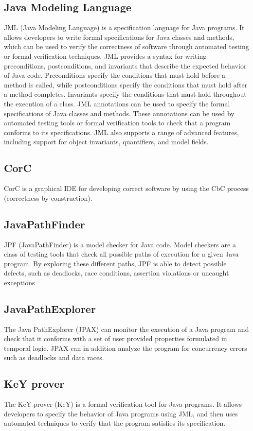 \subsection{Java Modeling Language}
JML (Java Modeling Language) is a specification language for Java programs. It allows developers to write formal specifications for Java classes and methods, which can be used to verify the correctness of software through automated testing or formal verification techniques.
JML provides a syntax for writing preconditions, postconditions, and invariants that describe the expected behavior of Java code. Preconditions specify the conditions that must hold before a method is called, while postconditions specify the conditions that must hold after a method completes. Invariants specify the conditions that must hold throughout the execution of a class.
JML annotations can be used to specify the formal specifications of Java classes and methods. These annotations can be used by automated testing tools or formal verification tools to check that a program conforms to its specifications. JML also supports a range of advanced features, including support for object invariants, quantifiers, and model fields.
\subsection{CorC}
CorC is a graphical IDE for developing correct software by using the CbC process (correctness by construction). 
\subsection{JavaPathFinder}
JPF (JavaPathFinder) is a model checker for Java code. Model checkers are a class of testing tools that check all possible paths of execution for a given Java program. 
By exploring these different paths, JPF is able to detect possible defects, such as deadlocks, race conditions, assertion violations or uncaught exceptions
\subsection{JavaPathExplorer}
 The Java PathExplorer (JPAX) can monitor the execution of a Java program and check that it conforms with a set of user provided properties
 formulated in temporal logic. JPAX can in addition analyze the program for concurrency errors such as deadlocks
 and data races.\citep{Havelund_Rosu_2004}
\subsection{KeY prover}
The KeY prover (KeY) is a formal verification tool for Java programs. It allows developers to specify the behavior of Java programs using JML, and then uses automated techniques to verify that the program satisfies its specification.
	
